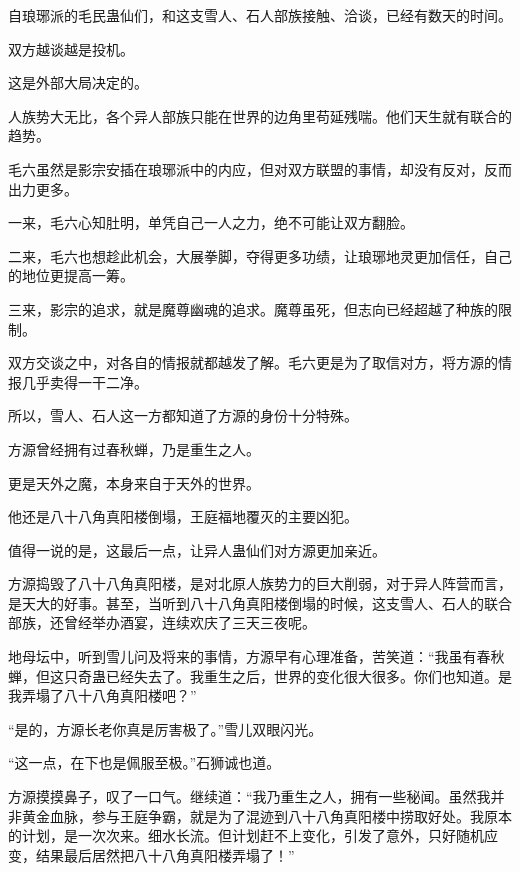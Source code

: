
\begin{this_body}



自琅琊派的毛民蛊仙们，和这支雪人、石人部族接触、洽谈，已经有数天的时间。

双方越谈越是投机。

这是外部大局决定的。

人族势大无比，各个异人部族只能在世界的边角里苟延残喘。他们天生就有联合的趋势。

毛六虽然是影宗安插在琅琊派中的内应，但对双方联盟的事情，却没有反对，反而出力更多。

一来，毛六心知肚明，单凭自己一人之力，绝不可能让双方翻脸。

二来，毛六也想趁此机会，大展拳脚，夺得更多功绩，让琅琊地灵更加信任，自己的地位更提高一筹。

三来，影宗的追求，就是魔尊幽魂的追求。魔尊虽死，但志向已经超越了种族的限制。

双方交谈之中，对各自的情报就都越发了解。毛六更是为了取信对方，将方源的情报几乎卖得一干二净。

所以，雪人、石人这一方都知道了方源的身份十分特殊。

方源曾经拥有过春秋蝉，乃是重生之人。

更是天外之魔，本身来自于天外的世界。

他还是八十八角真阳楼倒塌，王庭福地覆灭的主要凶犯。

值得一说的是，这最后一点，让异人蛊仙们对方源更加亲近。

方源捣毁了八十八角真阳楼，是对北原人族势力的巨大削弱，对于异人阵营而言，是天大的好事。甚至，当听到八十八角真阳楼倒塌的时候，这支雪人、石人的联合部族，还曾经举办酒宴，连续欢庆了三天三夜呢。

地母坛中，听到雪儿问及将来的事情，方源早有心理准备，苦笑道：“我虽有春秋蝉，但这只奇蛊已经失去了。我重生之后，世界的变化很大很多。你们也知道。是我弄塌了八十八角真阳楼吧？”

“是的，方源长老你真是厉害极了。”雪儿双眼闪光。

“这一点，在下也是佩服至极。”石狮诚也道。

方源摸摸鼻子，叹了一口气。继续道：“我乃重生之人，拥有一些秘闻。虽然我并非黄金血脉，参与王庭争霸，就是为了混迹到八十八角真阳楼中捞取好处。我原本的计划，是一次次来。细水长流。但计划赶不上变化，引发了意外，只好随机应变，结果最后居然把八十八角真阳楼弄塌了！”


\end{this_body}
